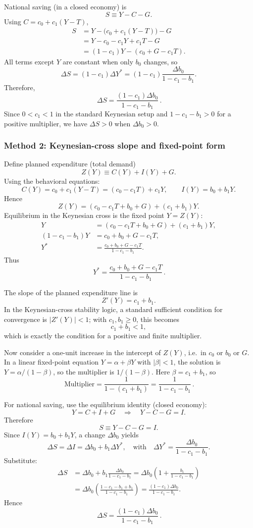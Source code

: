 \documentclass[12pt]{article}
\begin{document}
\begin{enumerate}[label=(\alph*)]
National saving (in a closed economy) is
\[
S \equiv Y - C - G.
\]
Using \(C=c_0+c_1(Y-T)\),
\begin{align*}
S &= Y - \bigl(c_0+c_1(Y-T)\bigr) - G \\
  &= Y - c_0 - c_1Y + c_1T - G \\
  &= (1-c_1)Y - (c_0+G-c_1T).
\end{align*}
All terms except \(Y\) are constant when only \(b_0\) changes, so
\[
\Delta S = (1-c_1)\Delta Y^*
= (1-c_1)\frac{\Delta b_0}{1-c_1-b_1}.
\]
Therefore,
\[
\boxed{\,\Delta S = \dfrac{(1-c_1)\Delta b_0}{1-c_1-b_1}\, }.
\]
Since \(0<c_1<1\) in the standard Keynesian setup and \(1-c_1-b_1>0\) for a positive multiplier, we have \(\Delta S>0\) when \(\Delta b_0>0\).
\end{enumerate}

\subsubsection*{Method 2: Keynesian-cross slope and fixed-point form}
Define planned expenditure (total demand)
\[
Z(Y)\equiv C(Y)+I(Y)+G.
\]
Using the behavioral equations:
\[
C(Y)=c_0+c_1(Y-T)=(c_0-c_1T)+c_1Y,\qquad I(Y)=b_0+b_1Y.
\]
Hence
\[
Z(Y)=(c_0-c_1T+b_0+G) + (c_1+b_1)Y.
\]
Equilibrium in the Keynesian cross is the fixed point \(Y=Z(Y)\):
\begin{align*}
Y &= (c_0-c_1T+b_0+G) + (c_1+b_1)Y,\\
(1-c_1-b_1)Y &= c_0+b_0+G-c_1T,\\
Y^* &= \frac{c_0+b_0+G-c_1T}{1-c_1-b_1}.
\end{align*}
Thus
\[
\boxed{\,
Y^*=\dfrac{c_0 + b_0 + G - c_1T}{1-c_1-b_1}
\, }.
\]

The slope of the planned expenditure line is
\[
Z'(Y)=c_1+b_1.
\]
In the Keynesian-cross stability logic, a standard sufficient condition for convergence is \(|Z'(Y)|<1\); with \(c_1,b_1\ge 0\), this becomes
\[
c_1+b_1<1,
\]
which is exactly the condition for a positive and finite multiplier.

Now consider a one-unit increase in the intercept of \(Z(Y)\), i.e.\ in \(c_0\) or \(b_0\) or \(G\). In a linear fixed-point equation \(Y=\alpha+\beta Y\) with \(|\beta|<1\), the solution is \(Y=\alpha/(1-\beta)\), so the multiplier is \(1/(1-\beta)\). Here \(\beta=c_1+b_1\), so
\[
\boxed{\,\text{Multiplier}=\dfrac{1}{1-(c_1+b_1)}=\dfrac{1}{1-c_1-b_1}\, }.
\]

For national saving, use the equilibrium identity (closed economy):
\[
Y=C+I+G \quad\Longrightarrow\quad Y-C-G=I.
\]
Therefore
\[
S \equiv Y-C-G = I.
\]
Since \(I(Y)=b_0+b_1Y\), a change \(\Delta b_0\) yields
\[
\Delta S = \Delta I = \Delta b_0 + b_1\Delta Y^*,
\quad\text{with}\quad
\Delta Y^*=\frac{\Delta b_0}{1-c_1-b_1}.
\]
Substitute:
\begin{align*}
\Delta S
&= \Delta b_0 + b_1\frac{\Delta b_0}{1-c_1-b_1}
= \Delta b_0\left(1+\frac{b_1}{1-c_1-b_1}\right) \\
&= \Delta b_0\left(\frac{1-c_1-b_1+b_1}{1-c_1-b_1}\right)
= \frac{(1-c_1)\Delta b_0}{1-c_1-b_1}.
\end{align*}
Hence
\[
\boxed{\,\Delta S = \dfrac{(1-c_1)\Delta b_0}{1-c_1-b_1}\, }.
\]
\end{document}
